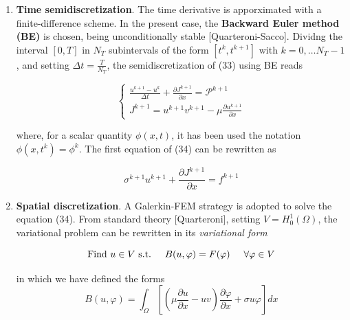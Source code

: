 \documentclass[a4paper]{article}
\begin{document}
\begin{enumerate}
	\item \textbf{Time semidiscretization}. The time derivative is apporximated with a finite-difference scheme. In the present case, the \textbf{Backward Euler method (BE)} is chosen, being unconditionally stable [Quarteroni-Sacco]. Dividng the interval $[0,T]$ in $N_T$ subintervals of the form $[t^k, t^{k+1}]$ with $ k=0, \dots N_T-1$, and setting $\Delta t = \frac{T}{N_T} $, the semidiscretization of (33) using BE reads
	
	\begin{equation}
	\begin{cases}
	\frac{u^{k+1} - u^k}{\Delta t} +\frac{\partial J^{k+1}}{\partial x} = \mathcal{P}^{k+1}  \\
	J^{k+1} = u^{k+1} v^{k+1} - \mu \frac{\partial u^{k+1}}{\partial x} 
	\end{cases}
	\end{equation}
	
	where, for a scalar quantity $\phi(x,t)$, it has been used the notation $ \phi(x,t^k) = \phi^k$. The first equation of (34) can be rewritten as
	
	\begin{equation}
	\sigma ^{k+1} u^{k+1} +\frac{\partial J^{k+1}}{\partial x} = f^{k+1} 
	\end{equation}
	
	\item \textbf{Spatial discretization}. A Galerkin-FEM strategy is adopted to solve the equation (34). From standard theory [Quarteroni], setting $V = H_0^1(\Omega)$, the variational problem can be rewritten in its \textit{variational form}
	
	\begin{equation}
	\text{Find $u \in V$ s.t.} \hspace{0.5cm} B(u,\varphi) = F(\varphi) \hspace{0.5cm} \forall \varphi \in V
	\end{equation}
	
	in which we have defined the forms
	\begin{equation}
	B(u,\varphi) = \int_{\Omega}\left[\left(\mu \frac{\partial u}{\partial x} - uv\right) \frac{\partial \varphi}{\partial x} + \sigma u \varphi \right]  dx
	\end{equation}
	

\end{enumerate}
\end{document}
